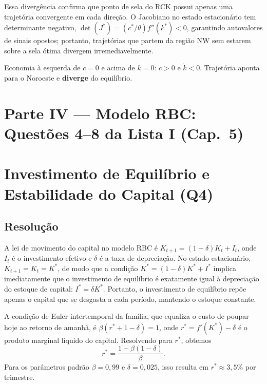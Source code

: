 \documentclass[12pt, a4paper]{article}
\begin{document}
Essa divergência confirma que ponto de sela do RCK possui apenas uma trajetória convergente em cada direção. O Jacobiano no estado estacionário tem determinante negativo, $\det(J^*) = (c^*/\theta)f''(k^*) < 0$, garantindo autovalores de sinais opostos; portanto, trajetórias que partem da região NW sem estarem sobre a sela ótima divergem irremediavelmente.

\begin{resultbox}[title={Região NW no Diagrama de Fases (Q3)}]
Economia à esquerda de $\dot{c}=0$ e acima de $\dot{k}=0$: $\dot{c}>0$ e $\dot{k}<0$. Trajetória aponta para o Noroeste e \textbf{diverge} do equilíbrio.
\end{resultbox}

\section*{\large\color{cyanrbc} Parte IV --- Modelo RBC: Questões 4--8 da Lista I (Cap.\ 5)}

\section{Investimento de Equilíbrio e Estabilidade do Capital (Q4)}

\subsection*{Resolução}

A lei de movimento do capital no modelo RBC é $K_{t+1} = (1-\delta)K_t + I_t$, onde $I_t$ é o investimento efetivo e $\delta$ é a taxa de depreciação. No estado estacionário, $K_{t+1} = K_t = K^*$, de modo que a condição $K^* = (1-\delta)K^* + I^*$ implica imediatamente que o investimento de equilíbrio é exatamente igual à depreciação do estoque de capital: $I^* = \delta K^*$. Portanto, o investimento de equilíbrio repõe apenas o capital que se desgasta a cada período, mantendo o estoque constante.

A condição de Euler intertemporal da família, que equaliza o custo de poupar hoje ao retorno de amanhã, é $\beta(r^* + 1 - \delta) = 1$, onde $r^* = f'(K^*) - \delta$ é o produto marginal líquido do capital. Resolvendo para $r^*$, obtemos
\[
r^* = \frac{1-\beta(1-\delta)}{\beta}.
\]
Para os parâmetros padrão $\beta=0{,}99$ e $\delta=0{,}025$, isso resulta em $r^* \approx 3{,}5\%$ por trimestre.
\end{document}
